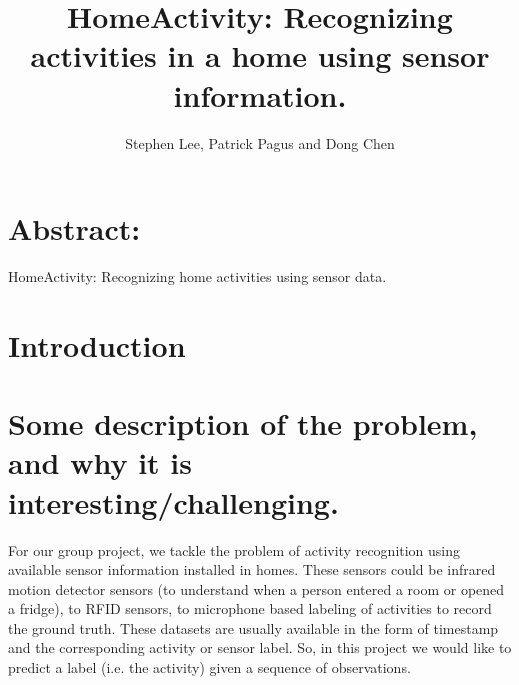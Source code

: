 \documentclass[11pt, oneside]{article}   	%
\title{HomeActivity: Recognizing activities in a home using sensor information. }
\author{Stephen Lee, Patrick Pagus and Dong Chen}
\begin{document}
\maketitle
\section{Abstract:}
HomeActivity: Recognizing home activities using sensor data. 

\section{Introduction}

\section{Some description of the problem, and why it is interesting/challenging.}
For our group project, we tackle the problem of activity recognition using available sensor information installed in homes. 
These sensors could be infrared motion detector sensors (to understand when a person entered a room or opened a fridge),
to RFID sensors, to microphone based labeling of activities to record the ground truth. These datasets 
are usually available in the form of timestamp and the corresponding activity or sensor label. 
So, in this project we would like to predict a label (i.e. the activity) given a sequence of observations. 
\end{document}
